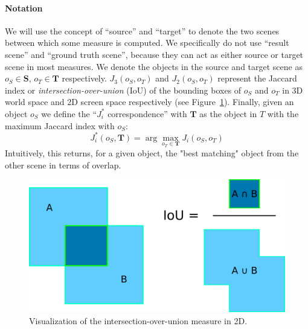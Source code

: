 \documentclass[10pt,twocolumn,letterpaper]{article}
\newcommand{\bb}[1]{{\bm{#1}}}
\begin{document}
\paragraph{Notation} We will use the concept of ``source'' and ``target''
to denote the two scenes between which some measure is computed. We
specifically do not use ``result scene'' and ``ground truth scene'', because
they can act as either source or target scene in most measures. We denote
the objects in the source and target scene as $o_S \in \bb{S}$, $o_T \in \bb{T}$
respectively.  $J_3(o_S, o_T)$ and $J_2(o_S, o_T)$ represent the Jaccard index
or \emph{intersection-over-union} (IoU) of the bounding boxes of $o_S$ and
$o_T$ in 3D world space and 2D screen space respectively (see Figure~\ref{fig:ch4:iou}). Finally, given an
object $o_S$ we define the ``$J_i^*$ correspondence'' with $\bb{T}$ as the object in
$T$ with the maximum Jaccard index with $o_S$: \[ J_i^*(o_S, \bb{T}) = \arg\max_{o_T \in \bb{T}}
J_i(o_S, o_T) \]
Intuitively, this returns, for a given object, the "best matching" object from
the other scene in terms of overlap.
\begin{figure}
    \includegraphics[width=\linewidth]{figures/iou/iou}
    \caption[Intersection-over-union visualization]{Visualization of the intersection-over-union measure in 2D.}
    \label{fig:ch4:iou}
\end{figure}
\end{document}
